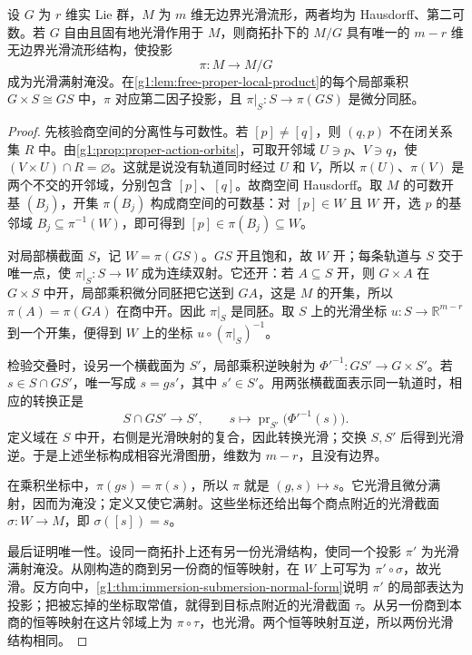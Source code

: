 \begin{theorem}\label{g1:thm:free-proper-quotient}
	设 \(G\) 为 \(r\) 维实 Lie 群，\(M\) 为 \(m\) 维无边界光滑流形，两者均为 Hausdorff、第二可数。若 \(G\) 自由且固有地光滑作用于 \(M\)，则商拓扑下的 \(M/G\) 具有唯一的 \(m-r\) 维无边界光滑流形结构，使投影
	\[
		\pi:M\longrightarrow M/G
	\]
	成为光滑满射淹没。在\cref{g1:lem:free-proper-local-product}的每个局部乘积 \(G\times S\cong GS\) 中，\(\pi\) 对应第二因子投影，且 \(\pi|_S:S\to\pi(GS)\) 是微分同胚。
\end{theorem}
\begin{proof}
	先核验商空间的分离性与可数性。若 \([p]\ne[q]\)，则 \((q,p)\) 不在闭关系集 \(R\) 中。由\cref{g1:prop:proper-action-orbits}，可取开邻域 \(U\ni p\)、\(V\ni q\)，使 \((V\times U)\cap R=\varnothing\)。这就是说没有轨道同时经过 \(U\) 和 \(V\)，所以 \(\pi(U)\)、\(\pi(V)\) 是两个不交的开邻域，分别包含 \([p]\)、\([q]\)。故商空间 Hausdorff。取 \(M\) 的可数开基 \((B_j)\)，开集 \(\pi(B_j)\) 构成商空间的可数基：对 \([p]\in W\) 且 \(W\) 开，选 \(p\) 的基邻域 \(B_j\subseteq\pi^{-1}(W)\)，即可得到 \([p]\in\pi(B_j)\subseteq W\)。

	对局部横截面 \(S\)，记 \(W=\pi(GS)\)。\(GS\) 开且饱和，故 \(W\) 开；每条轨道与 \(S\) 交于唯一点，使 \(\pi|_S:S\to W\) 成为连续双射。它还开：若 \(A\subseteq S\) 开，则 \(G\times A\) 在 \(G\times S\) 中开，局部乘积微分同胚把它送到 \(GA\)，这是 \(M\) 的开集，所以 \(\pi(A)=\pi(GA)\) 在商中开。因此 \(\pi|_S\) 是同胚。取 \(S\) 上的光滑坐标 \(u:S\to\mathbb R^{m-r}\) 到一个开集，便得到 \(W\) 上的坐标 \(u\circ(\pi|_S)^{-1}\)。

	检验交叠时，设另一个横截面为 \(S'\)，局部乘积逆映射为 \(\Phi'^{-1}:GS'\to G\times S'\)。若 \(s\in S\cap GS'\)，唯一写成 \(s=g s'\)，其中 \(s'\in S'\)。用两张横截面表示同一轨道时，相应的转换正是
	\[
		S\cap GS'\longrightarrow S',\qquad
		s\longmapsto\operatorname{pr}_{S'}\bigl(\Phi'^{-1}(s)\bigr).
	\]
	定义域在 \(S\) 中开，右侧是光滑映射的复合，因此转换光滑；交换 \(S,S'\) 后得到光滑逆。于是上述坐标构成相容光滑图册，维数为 \(m-r\)，且没有边界。

	在乘积坐标中，\(\pi(gs)=\pi(s)\)，所以 \(\pi\) 就是 \((g,s)\mapsto s\)。它光滑且微分满射，因而为淹没；定义又使它满射。这些坐标还给出每个商点附近的光滑截面 \(\sigma:W\to M\)，即 \(\sigma([s])=s\)。

	最后证明唯一性。设同一商拓扑上还有另一份光滑结构，使同一个投影 \(\pi'\) 为光滑满射淹没。从刚构造的商到另一份商的恒等映射，在 \(W\) 上可写为 \(\pi'\circ\sigma\)，故光滑。反方向中，\cref{g1:thm:immersion-submersion-normal-form}说明 \(\pi'\) 的局部表达为投影；把被忘掉的坐标取常值，就得到目标点附近的光滑截面 \(\tau\)。从另一份商到本商的恒等映射在这片邻域上为 \(\pi\circ\tau\)，也光滑。两个恒等映射互逆，所以两份光滑结构相同。
\end{proof}

